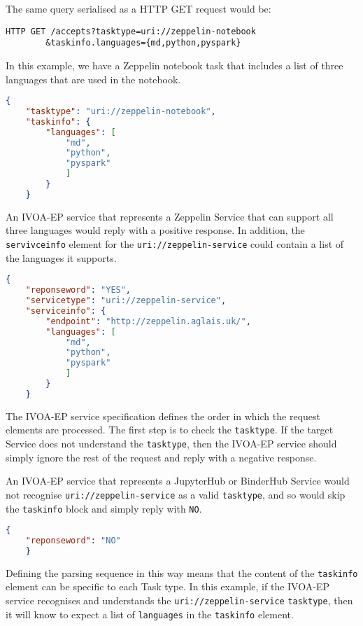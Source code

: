 \documentclass[11pt,a4paper]{ivoa}
\newcommand{\ivoep} {IVOA-EP\xspace}
\newcommand{\binderhub} {BinderHub\xspace}
\newcommand{\jupyterhub} {JupyterHub\xspace}
\newcommand{\zeppelin} {Zeppelin\xspace}
\newcommand{\codeword}[1] {\texttt{#1}}
\begin{document}
The same query serialised as a HTTP GET request would be:
\begin{lstlisting}[]
    HTTP GET /accepts?tasktype=uri://zeppelin-notebook
        &taskinfo.languages={md,python,pyspark}
\end{lstlisting}

In this example, we have a \zeppelin notebook task that includes a list of three languages that are used in the notebook.
\begin{lstlisting}[language=json]
    {
    "tasktype": "uri://zeppelin-notebook",
    "taskinfo": {
        "languages": [
            "md",
            "python",
            "pyspark"
            ]
        }
    }
\end{lstlisting}

An \ivoep service that represents a \zeppelin Service that can support all three languages would reply with a positive response.
In addition, the \codeword{servivceinfo} element for the \codeword{uri://zeppelin-service} could contain a list of the languages it supports.
\begin{lstlisting}[language=json]
    {
    "reponseword": "YES",
    "servicetype": "uri://zeppelin-service",
    "serviceinfo": {
        "endpoint": "http://zeppelin.aglais.uk/",
        "languages": [
            "md",
            "python",
            "pyspark"
            ]
        }
    }
\end{lstlisting}

The \ivoep service specification defines the order in which the request elements are processed.
The first step is to check the \codeword{tasktype}. If the target Service does not understand the \codeword{tasktype}, then the \ivoep service should simply ignore the rest of the request and reply with a negative response.

An \ivoep service that represents a \jupyterhub or \binderhub Service would not recognise \codeword{uri://zeppelin-service} as a valid \codeword{tasktype}, and so would skip the \codeword{taskinfo} block and simply reply with \codeword{NO}.
\begin{lstlisting}[language=json]
    {
    "reponseword": "NO"
    }
\end{lstlisting}

Defining the parsing sequence in this way means that the content of the \codeword{taskinfo} element can be specific to each Task type.
In this example, if the \ivoep service recognises and understands the \codeword{uri://zeppelin-service} \codeword{tasktype}, then it will know to expect a list of \codeword{languages} in the \codeword{taskinfo} element.
\end{document}
